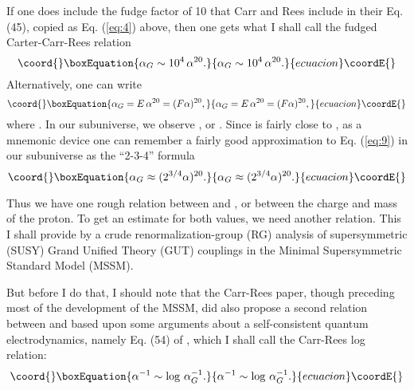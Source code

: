 \documentclass[a4paper,12pt]{article}
\begin{document}
	If one does include the fudge factor of 10
that Carr and Rees include in their Eq. (45),
copied as Eq. (\ref{eq:4}) above,
then one gets what I shall call the fudged
Carter-Carr-Rees relation
 \begin{equation}\coord{}\boxEquation{
 \alpha_G \sim 10^4\,\alpha^{20}.
 \label{eq:8}
 }{
 \alpha_G \sim 10^4\,\alpha^{20}.
 }{ecuacion}\coordE{}\end{equation}
Alternatively, one can write
 \begin{equation}\coord{}\boxEquation{
 \alpha_G = E \,\alpha^{20} = (F \alpha)^{20},
 \label{eq:9}
 }{
 \alpha_G = E \,\alpha^{20} = (F \alpha)^{20},
 }{ecuacion}\coordE{}\end{equation}
where \coordHE{}.
In our subuniverse, we observe \coordHE{},
or \coordHE{} \cite{PDG}.
Since \coordHE{} is fairly close to \coordHE{},
as a mnemonic device one can remember
a fairly good approximation to Eq. (\ref{eq:9})
in our subuniverse as the ``2-3-4'' formula
 \begin{equation}\coord{}\boxEquation{
 \alpha_G \approx (2^{3/4} \alpha)^{20}.
 \label{eq:9b}
 }{
 \alpha_G \approx (2^{3/4} \alpha)^{20}.
 }{ecuacion}\coordE{}\end{equation}

	Thus we have one rough relation
between \coordHE{} and \coordHE{},
or between the charge \coordHE{} and mass \coordHE{} of the proton.
To get an estimate for both values, we need another relation.
This I shall provide by a crude renormalization-group (RG)
analysis of supersymmetric (SUSY)
Grand Unified Theory (GUT) couplings
in the Minimal Supersymmetric Standard Model (MSSM).

	But before I do that, I should note that the Carr-Rees
paper, though preceding most of the development of the MSSM,
did also propose a second relation between \myHighlight{$\alpha$}\coordHE{}
and \coordHE{} based upon some arguments about
a self-consistent quantum electrodynamics, namely Eq. (54)
of \cite{Carr-Rees}, which I shall call the Carr-Rees log relation:
 \begin{equation}\coord{}\boxEquation{
 \alpha^{-1} \sim \log \, \alpha_G^{-1}.
 \label{eq:10}
 }{
 \alpha^{-1} \sim \log \, \alpha_G^{-1}.
 }{ecuacion}\coordE{}\end{equation}
\end{document}
